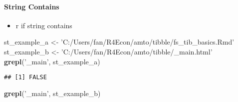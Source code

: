 \documentclass[
]{book}
\newenvironment{Shaded}{\begin{snugshade}}{\end{snugshade}}
\newcommand{\CharTok}[1]{\textcolor[rgb]{0.31,0.60,0.02}{#1}}
\newcommand{\CommentTok}[1]{\textcolor[rgb]{0.56,0.35,0.01}{\textit{#1}}}
\newcommand{\DataTypeTok}[1]{\textcolor[rgb]{0.13,0.29,0.53}{#1}}
\newcommand{\KeywordTok}[1]{\textcolor[rgb]{0.13,0.29,0.53}{\textbf{#1}}}
\newcommand{\NormalTok}[1]{#1}
\newcommand{\OperatorTok}[1]{\textcolor[rgb]{0.81,0.36,0.00}{\textbf{#1}}}
\newcommand{\StringTok}[1]{\textcolor[rgb]{0.31,0.60,0.02}{#1}}
\providecommand{\tightlist}{%
  \setlength{\itemsep}{0pt}\setlength{\parskip}{0pt}}
\begin{document}
\begin{Shaded}
\end{Shaded}

\hypertarget{string-contains}{%
\paragraph{String Contains}\label{string-contains}}

\begin{itemize}
\tightlist
\item
  r if string contains
\end{itemize}

\begin{Shaded}
\begin{Highlighting}[]
\NormalTok{st_example_a <-}\StringTok{ 'C:/Users/fan/R4Econ/amto/tibble/fs_tib_basics.Rmd'}
\NormalTok{st_example_b <-}\StringTok{ 'C:/Users/fan/R4Econ/amto/tibble/_main.html'}
\KeywordTok{grepl}\NormalTok{(}\StringTok{'_main'}\NormalTok{, st_example_a)}
\end{Highlighting}
\end{Shaded}

\begin{verbatim}
## [1] FALSE
\end{verbatim}

\begin{Shaded}
\begin{Highlighting}[]
\KeywordTok{grepl}\NormalTok{(}\StringTok{'_main'}\NormalTok{, st_example_b)}
\end{Highlighting}
\end{Shaded}
\end{document}
